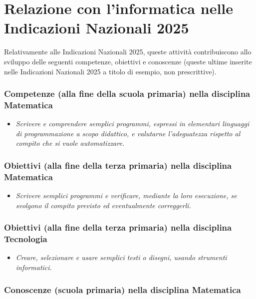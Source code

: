 \section{Relazione con l'informatica nelle Indicazioni Nazionali 2025 }\label{relazione-con-linformatica-nelle-indicazioni-nazionali-4}

Relativamente alle Indicazioni Nazionali 2025, queste attività contribuiscono allo sviluppo delle seguenti competenze, obiettivi e conoscenze (queste ultime inserite nelle Indicazioni Nazionali 2025 a titolo di esempio, non prescrittive).


\subsubsection{Competenze (alla fine della scuola primaria) nella disciplina Matematica}


\begin{itemize}
\item
  \emph{Scrivere e comprendere semplici programmi, espressi in elementari linguaggi di programmazione a scopo didattico, e valutarne l'adeguatezza rispetto al compito che si vuole automatizzare.}
\end{itemize}



\subsubsection{Obiettivi (alla fine della terza primaria) nella disciplina Matematica}


\begin{itemize}
\item
  \emph{Scrivere semplici programmi e verificare, mediante la loro esecuzione, se svolgono il compito previsto ed eventualmente correggerli.}
\end{itemize}


\subsubsection{Obiettivi (alla fine della terza primaria) nella disciplina Tecnologia}


\begin{itemize}
\item
  \emph{Creare, selezionare e usare semplici testi o disegni, usando strumenti informatici.}
\end{itemize}

\subsubsection{Conoscenze (scuola primaria) nella disciplina Matematica}

